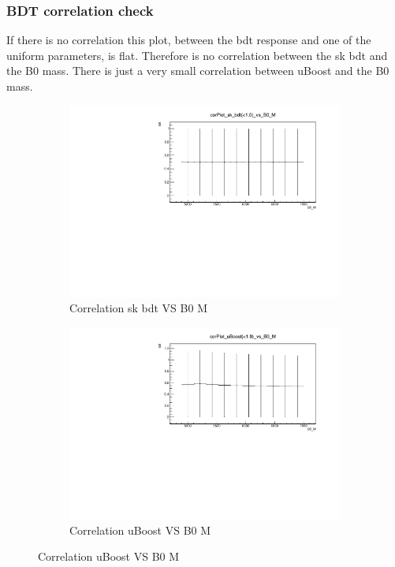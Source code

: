 \documentclass{beamer}
\begin{document}
\begin{frame}
\frametitle{BDT correlation check}
If there is no correlation this plot, between the bdt response and one of the uniform parameters, is flat.
Therefore is no correlation between the sk bdt and the B0 mass. There is just a very small correlation between uBoost and the B0 mass.
 \begin{figure}
 \centering
 \begin{subfigure}{0.5\textwidth}
 \centering
 \includegraphics[width=1.0\linewidth]{plots/corPlot_sk_bdt(<1.0)_vs_B0_M.pdf}
 \caption{Correlation sk bdt VS B0 M}
 \end{subfigure}%
\begin{subfigure}{0.5\textwidth}
\centering
\includegraphics[width=1.0\linewidth]{plots/corPlot_uBoost(<1.0)_vs_B0_M.pdf}
\caption{Correlation uBoost VS B0 M}
\end{subfigure}
\end{figure}
\end{frame}
\end{document}
